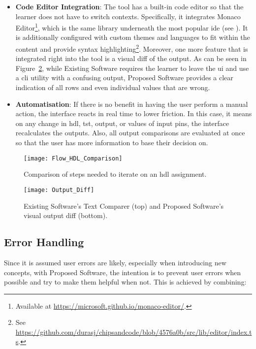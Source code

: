 \begin{itemize}
    \item \textbf{Code Editor Integration}: The tool has a built-in code editor so that the learner does not have to switch contexts. Specifically, it integrates Monaco Editor\footnote{Available at \url{https://microsoft.github.io/monaco-editor/}.}, which is the same library underneath the most popular \gls{ide} (see ). It is additionally configured with custom themes and languages to fit within the content and provide syntax highlighting\footnote{See \url{https://github.com/durasj/chipsandcode/blob/4576a0b/src/lib/editor/index.ts}.}. Moreover, one more feature that is integrated right into the tool is a visual diff of the output. As can be seen in Figure~\ref{fig:design-diff}, while Existing Software requires the learner to leave the \gls{ui} and use a \gls{cli} utility with a confusing output, Proposed Software provides a clear indication of all rows and even individual values that are wrong.
    \item \textbf{Automatisation}: If there is no benefit in having the user perform a manual action, the interface reacts in real time to lower friction. In this case, it means on any change in \gls{hdl}, \gls{tst}, output, or values of input pins, the interface recalculates the outputs. Also, all output comparisons are evaluated at once so that the user has more information to base their decision on.
\end{itemize}

\begin{figure}[H]
    \centering
    \texttt{[image: Flow\_HDL\_Comparison]}
    \caption{Comparison of steps needed to iterate on an \gls{hdl} assignment.}
    \label{fig:design-hdl-steps}
\end{figure}

\begin{figure}[H]
    \centering
    \texttt{[image: Output\_Diff]}
    \caption{Existing Software's Text Comparer (top) and Proposed Software's visual output diff (bottom).}
    \label{fig:design-diff}
\end{figure}

\subsection{Error Handling}
\label{sec:ui-error-handling}

Since it is assumed user errors are likely, especially when introducing new concepts, with Proposed Software, the intention is to prevent user errors when possible and try to make them helpful when not.
This is achieved by combining:

